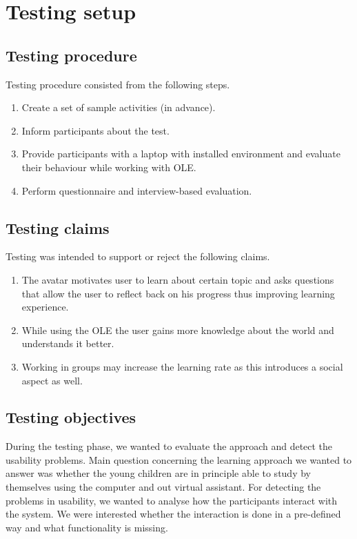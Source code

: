 \documentclass[a4paper]{article}
\begin{document}
\section{Testing setup}

\subsection{Testing procedure} 

Testing procedure consisted from the following steps.

\begin{enumerate}
	\item Create a set of sample activities (in advance).
	\item Inform participants about the test.
	\item Provide participants with a laptop with installed environment and evaluate their behaviour while working with OLE.
	\item Perform questionnaire and interview-based evaluation.
\end{enumerate}

\subsection{Testing claims}

Testing was intended to support or reject the following claims.

\begin{enumerate}
	\item The avatar motivates user to learn about certain topic and asks questions that allow the user to reflect back on his progress thus improving learning experience.
	\item While using the OLE the user gains more knowledge about the world and understands it better. 
	\item Working in groups may increase the learning rate as this introduces a social aspect as well.
\end{enumerate}

\subsection{Testing objectives}

During the testing phase, we wanted to evaluate the approach and detect the usability problems. Main question concerning the learning approach we wanted to answer was whether the young children are in principle able to study by themselves using the computer and out virtual assistant. For detecting the problems in usability, we wanted to analyse how the participants interact with the system. We were interested whether the interaction is done in a pre-defined way and what functionality is missing.
\end{document}
